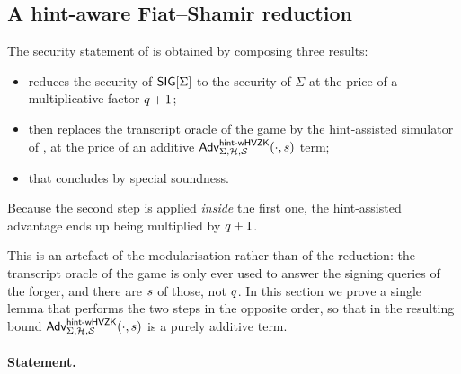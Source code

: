 
\subsection{A hint-aware Fiat--Shamir reduction}\label{sec:fs-hints}

The security statement of  is obtained by composing
three results:
\begin{itemize}
    \item {} reduces the \EUFCMA security of $\mathsf{SIG}[\Sigma]$ to the \IMPPA security of $\Sigma$ at the price of a multiplicative factor $q+1$; 
    \item {} then replaces the transcript oracle of the \IMPPA game by the hint-assisted simulator of , at the price of an additive $\mathsf{Adv}^{\mathsf{hint}\text{-}\mathsf{wHVZK}}_{\Sigma,\mathcal{H}, \operatorname{\mathcal{S}}}(\cdot, s)$ term;
    \item {} that concludes by special soundness.
\end{itemize}
Because the second step is applied \emph{inside} the first one, the hint-assisted \wHVZK advantage ends up being multiplied by $q+1$.

This is an artefact of the modularisation rather than of the reduction: the transcript oracle of the \IMPPA game is only ever used to answer the signing queries of the forger, and there are $s$ of those, not $q$.
In this section we prove a single lemma that performs the two steps in the opposite order, so that in the resulting bound $\mathsf{Adv}^{\mathsf{hint}\text{-}\mathsf{wHVZK}}_{\Sigma,\mathcal{H}, \operatorname{\mathcal{S}}}(\cdot, s)$ is a purely additive term.


\paragraph{Statement.} 

